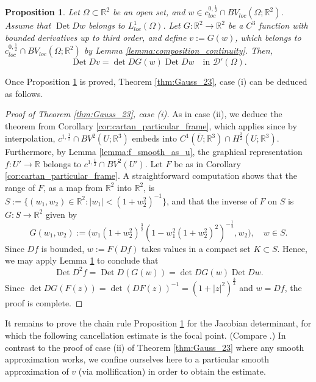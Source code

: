 \documentclass[12pt]{article}
\newcommand{\R}{\mathbb{R}}
\newcommand{\Det}{\operatorname{Det}}
\theoremstyle{plain}
\newtheorem{proposition}[theorem]{Proposition}
\numberwithin{equation}{section}
\begin{document}
\begin{proposition} \label{prop:BV_det_chain}
    Let $\Omega \subset \R^2$ be an open set, and $w \in c^{0,\frac12}_{loc}\cap BV_{loc}(\Omega;\R^2)$. Assume that $\Det Dw$ belongs to $L^1_{loc}(\Omega)$. Let $G : \R^2 \to \R^2$ be a $C^3$ function with bounded derivatives up to third order, and define $v := G(w)$, which belongs to $c^{0,\frac12}_{loc}\cap BV_{loc}(\Omega;\R^2)$ by Lemma \ref{lemma:composition_continuity}. Then,
    \begin{equation*}
        \Det Dv = \det DG(w) \Det Dw \quad \text{in } \mathcal{D}'(\Omega).
    \end{equation*}
\end{proposition}
Once Proposition \ref{prop:BV_det_chain} is proved, Theorem \ref{thm:Gauss_23}, case (i) can be deduced as follows.
\begin{proof}[Proof of Theorem \ref{thm:Gauss_23}, case (i)]
    As in case (ii), we deduce the theorem from Corollary \ref{cor:cartan_particular_frame}, which applies since by interpolation, $c^{1,\frac12} \cap BV^2(U;\R^3)$ embeds into $C^1(\overline U;\R^3) \cap H^\frac32(U;\R^3)$. Furthermore, by Lemma \ref{lemma:f_smooth_as_u}, the graphical representation $f : U' \to \R$ belongs to $c^{1,\frac12} \cap BV^2(U')$. Let $F$ be as in Corollary \ref{cor:cartan_particular_frame}. A straightforward computation shows that the range of $F$, as a map from $\R^2$ into $\R^2$, is $S := \{(w_1,w_2) \in \R^2 : |w_1| < (1+w_2^2)^{-1}\}$, and that the inverse of $F$ on $S$ is $G : S \to \R^2$ given by
    \begin{equation*}
        G(w_1,w_2) := \big( w_1 (1+w_2^2)^\frac32 (1-w_1^2(1+w_2^2)^2)^{-\frac12}, w_2\big), \quad w \in S.
    \end{equation*}
    Since $Df$ is bounded, $w := F(Df)$ takes values in a compact set $K \subset S$.  Hence, we may apply Lemma \ref{prop:BV_det_chain} to conclude that
    \begin{equation*}
        \Det D^2f = \Det D(G(w)) = \det DG(w) \Det Dw.
    \end{equation*}
    Since $\det DG(F(z)) = \det(DF(z))^{-1} = (1+|z|^2)^\frac32$ and $w = Df$, the proof is complete.
\end{proof}
It remains to prove the chain rule Proposition \ref{prop:BV_det_chain} for the Jacobian determinant, for which the following cancellation estimate is the focal point. (Compare \cite[Lemma 5.8]{giron_21}.) In contrast to the proof of case (ii) of Theorem \ref{thm:Gauss_23} where any smooth approximation works, we confine ourselves here to a particular smooth approximation of $v$ (via mollification) in order to obtain the estimate.
\end{document}
